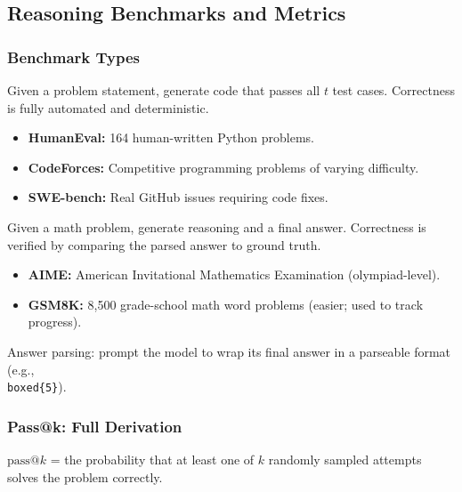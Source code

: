 \documentclass[11pt, a4paper]{article}
\begin{document}
\subsection{Reasoning Benchmarks and Metrics}

\subsubsection{Benchmark Types}

\begin{defbox}
Given a problem statement, generate code that passes all $t$ test cases. Correctness is fully automated and deterministic.
\begin{itemize}[leftmargin=1.5em]
  \item \textbf{HumanEval:} 164 human-written Python problems.
  \item \textbf{CodeForces:} Competitive programming problems of varying difficulty.
  \item \textbf{SWE-bench:} Real GitHub issues requiring code fixes.
\end{itemize}
\end{defbox}

\begin{defbox}
Given a math problem, generate reasoning and a final answer. Correctness is verified by comparing the parsed answer to ground truth.
\begin{itemize}[leftmargin=1.5em]
  \item \textbf{AIME:} American Invitational Mathematics Examination (olympiad-level).
  \item \textbf{GSM8K:} 8,500 grade-school math word problems (easier; used to track progress).
\end{itemize}
Answer parsing: prompt the model to wrap its final answer in a parseable format (e.g., \texttt{\\boxed\{5\}}).
\end{defbox}

\subsubsection{Pass@k: Full Derivation}

\begin{defbox}
$\text{pass@}k$ = the probability that at least one of $k$ randomly sampled attempts solves the problem correctly.
\end{defbox}
\end{document}
